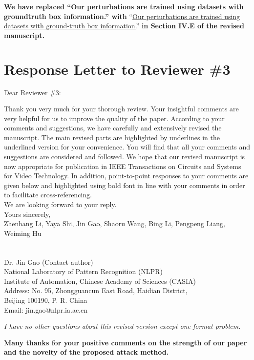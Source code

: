 \documentclass[12pt]{article}
\begin{document}
\textbf{We have replaced ``Our perturbations are trained using datasets with groundtruth box information.'' with} ``\uline{Our perturbations are trained using datasets with ground-truth box information.}'' \textbf{in Section IV.E of the revised manuscript.}

\clearpage
\newpage
{\centering\section*{Response Letter to Reviewer \#3}}
\noindent Dear Reviewer \#3:

Thank you very much for your thorough review. Your insightful comments are very helpful for us to improve the quality of the paper. According to your comments and suggestions, we have carefully and extensively revised the manuscript. The main revised parts are highlighted by underlines in the underlined version for your convenience. You will find that all your comments and suggestions are considered and followed. We hope that our revised manuscript is now appropriate for publication in IEEE Transactions on Circuits and Systems for Video Technology.
In addition, point-to-point responses to your comments are given below and highlighted using bold font in line with your comments in order to facilitate cross-referencing.\\[10pt]
\indent We are looking forward to your reply.\\[10pt]
\noindent Yours sincerely,\\
\noindent Zhenbang Li, Yaya Shi, Jin Gao, Shaoru Wang, Bing Li, Pengpeng Liang, Weiming Hu
\\
\\
\\
\noindent Dr. Jin Gao (Contact author)\\
\noindent National Laboratory of Pattern Recognition (NLPR)\\
\noindent Institute of Automation, Chinese Academy of Sciences (CASIA)\\
\noindent Address: No. 95, Zhongguancun East Road, Haidian District,\\
\noindent Beijing 100190, P. R. China\\
\noindent Email: jin.gao@nlpr.ia.ac.cn

\newpage

\textit{I have no other questions about this revised version except one format problem.}

\textbf{Many thanks for your positive comments on the strength of our paper and the novelty of the proposed attack method.}
\end{document}
